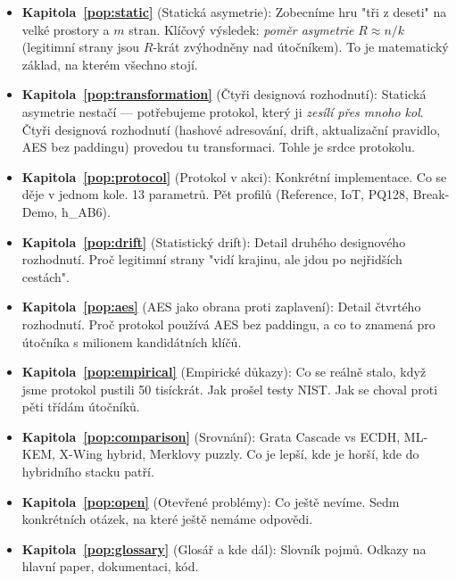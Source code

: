 \documentclass[11pt,a4paper]{article}
\begin{document}
\begin{itemize}[leftmargin=*]
\item \textbf{Kapitola~\ref{pop:static}} (Statická asymetrie): Zobecníme hru "tři z deseti" na velké prostory a $m$ stran. Klíčový výsledek: \emph{poměr asymetrie} $R \approx n/k$ (legitimní strany jsou $R$-krát zvýhodněny nad útočníkem). To je matematický základ, na kterém všechno stojí.

\item \textbf{Kapitola~\ref{pop:transformation}} (Čtyři designová rozhodnutí): Statická asymetrie nestačí --- potřebujeme protokol, který ji \emph{zesílí přes mnoho kol}. Čtyři designová rozhodnutí (hashové adresování, drift, aktualizační pravidlo, AES bez paddingu) provedou tu transformaci. Tohle je srdce protokolu.

\item \textbf{Kapitola~\ref{pop:protocol}} (Protokol v akci): Konkrétní implementace. Co se děje v jednom kole. 13 parametrů. Pět profilů (Reference, IoT, PQ128, Break-Demo, h\_AB6).

\item \textbf{Kapitola~\ref{pop:drift}} (Statistický drift): Detail druhého designového rozhodnutí. Proč legitimní strany "vidí krajinu, ale jdou po nejřidších cestách".

\item \textbf{Kapitola~\ref{pop:aes}} (AES jako obrana proti zaplavení): Detail čtvrtého rozhodnutí. Proč protokol používá AES bez paddingu, a co to znamená pro útočníka s milionem kandidátních klíčů.

\item \textbf{Kapitola~\ref{pop:empirical}} (Empirické důkazy): Co se reálně stalo, když jsme protokol pustili 50 tisíckrát. Jak prošel testy NIST. Jak se choval proti pěti třídám útočníků.

\item \textbf{Kapitola~\ref{pop:comparison}} (Srovnání): Grata Cascade vs ECDH, ML-KEM, X-Wing hybrid, Merklovy puzzly. Co je lepší, kde je horší, kde do hybridního stacku patří.

\item \textbf{Kapitola~\ref{pop:open}} (Otevřené problémy): Co ještě nevíme. Sedm konkrétních otázek, na které ještě nemáme odpovědi.

\item \textbf{Kapitola~\ref{pop:glossary}} (Glosář a kde dál): Slovník pojmů. Odkazy na hlavní paper, dokumentaci, kód.
\end{itemize}
\end{document}
